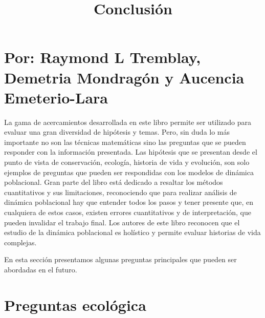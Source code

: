 \documentclass[
  12pt,
  letterpaper,
]{book}
\title{Conclusión}
\author{}
\date{}
\renewcommand*\contentsname{Table of contents}
\newcommand\contentsname{Table of contents}
\begin{document}
\frontmatter
\maketitle

\renewcommand*\contentsname{Table of contents}
{
\hypersetup{linkcolor=}
\setcounter{tocdepth}{2}
\tableofcontents
}

\mainmatter
\chapter{Por: Raymond L Tremblay, Demetria Mondragón y Aucencia
Emeterio-Lara}\label{por-raymond-l-tremblay-demetria-mondraguxf3n-y-aucencia-emeterio-lara}

La gama de acercamientos desarrollada en este libro permite ser
utilizado para evaluar una gran diversidad de hipótesis y temas. Pero,
sin duda lo más importante no son las técnicas matemáticas sino las
preguntas que se pueden responder con la información presentada. Las
hipótesis que se presentan desde el punto de vista de conservación,
ecología, historia de vida y evolución, son solo ejemplos de preguntas
que pueden ser respondidas con los modelos de dinámica poblacional. Gran
parte del libro está dedicado a resaltar los métodos cuantitativos y sus
limitaciones, reconociendo que para realizar análisis de dinámica
poblacional hay que entender todos los pasos y tener presente que, en
cualquiera de estos casos, existen errores cuantitativos y de
interpretación, que pueden invalidar el trabajo final. Los autores de
este libro reconocen que el estudio de la dinámica poblacional es
holístico y permite evaluar historias de vida complejas.

En esta sección presentamos algunas preguntas principales que pueden ser
abordadas en el futuro.

\chapter{Preguntas ecológica}\label{preguntas-ecoluxf3gica}
\end{document}
